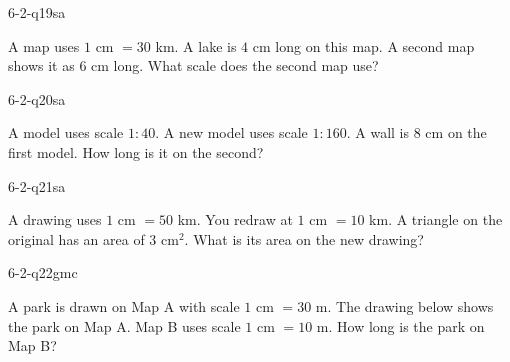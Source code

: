 \begin{practiceQuestion}{6-2-q19}{sa}
\begin{questionText}
A map uses $1$ cm $= 30$ km. A lake is $4$ cm long on this map. A second map shows it as $6$ cm long. What scale does the second map use?
\end{questionText}
\end{practiceQuestion}

\begin{practiceQuestion}{6-2-q20}{sa}
\begin{questionText}
A model uses scale $1:40$. A new model uses scale $1:160$. A wall is $8$ cm on the first model. How long is it on the second?
\end{questionText}
\end{practiceQuestion}

\begin{practiceQuestion}{6-2-q21}{sa}
\begin{questionText}
A drawing uses $1$ cm $= 50$ km. You redraw at $1$ cm $= 10$ km. A triangle on the original has an area of $3$ cm$^2$. What is its area on the new drawing?
\end{questionText}
\end{practiceQuestion}


\begin{practiceQuestion}{6-2-q22}{gmc}
\begin{questionText}
A park is drawn on Map A with scale $1$ cm $= 30$ m. The drawing below shows the park on Map A. Map B uses scale $1$ cm $= 10$ m. How long is the park on Map B?

\begin{center}
\end{center}
\end{questionText}
\end{practiceQuestion}

